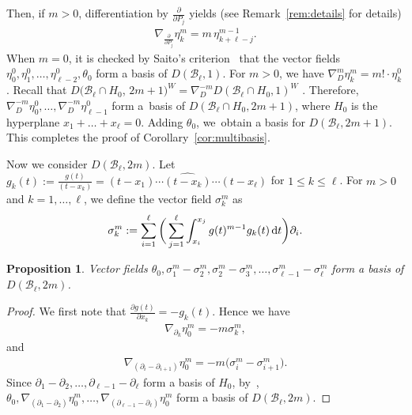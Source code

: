 \documentclass[pdftex]{sigma}
\numberwithin{equation}{section}
\newtheorem{Proposition}[Theorem]{Proposition}
{ \theoremstyle{definition}
\newtheorem{Definition}[Theorem]{Definition}
\newtheorem{Example}[Theorem]{Example}
\newtheorem{Remark}[Theorem]{Remark} }
\newcommand{\B}{\mathcal{B}}
\begin{document}
Then, if $m>0$, differentiation by $\frac{\partial}{\partial P_j}$ yields
(see Remark~\ref{rem:details} for details)
\begin{gather}
\label{eq:bibun}
\nabla_{\frac{\partial}{\partial P_j}}\eta_k^m=m\,\eta_{k+\ell-j}^{m-1}.
\end{gather}
When $m=0$, it is checked by Saito's criterion~\cite{ot,sai-log} that
the vector fields
$\eta_0^0, \eta_1^0, \dots, \eta_{\ell-2}^0, \theta_0$ form a
basis of $D(\B_\ell, 1)$.
For $m>0$, we have $\nabla_D^m\eta_k^m=m!\cdot\eta_k^0$.
Recall that
$D(\B_\ell\cap H_0$, $2m+1)^W=\nabla_D^{-m}D(\B_\ell\cap H_0, 1)^W$
\cite[Corollary~10]{yos-prim}. Therefore,
$\nabla_D^{-m}\eta_0^0, \dots, \nabla_D^{-m}\eta_{\ell-1}^0$ form a~basis of $D(\B_\ell\cap H_0, 2m+1)$, where $H_0$ is the hyperplane
$x_1+\dots + x_\ell=0$. Adding $\theta_0$, we~obtain a basis for
$D(\B_\ell, 2m+1)$.
This completes the proof of Corollary~\ref{cor:multibasis}.

Now we consider $D(\B_\ell, 2m)$. Let
$g_k(t):=\frac{g(t)}{(t-x_k)}=(t-x_1)\cdots \widehat{(t-x_k)}\cdots (t-x_\ell)$
for $1\leq k\leq \ell$.
For $m>0$ and $k=1, \dots, \ell$, we define the vector field $\sigma_k^m$ as
\begin{gather}
\label{eq:sigma1}
\sigma_k^m:=\sum_{i=1}^\ell\bigg(\sum_{j=1}^\ell\int_{x_i}^{x_j}g(t)^{m-1}g_k(t)\, {\rm d}t \bigg)\partial_i.
\end{gather}

\begin{Proposition}
\label{prop:simpleroots}
Vector fields
$\theta_0, \sigma_1^m-\sigma_2^m, \sigma_2^m-\sigma_3^m, \dots, \sigma_{\ell-1}^m-\sigma_\ell^m$ form a basis of $D(\B_\ell, 2m)$.
\end{Proposition}

\begin{proof}
We first note that $\frac{\partial g(t)}{\partial x_k}=-g_k(t)$. Hence we have
\begin{gather}
\label{eq:differentiate2}
\nabla_{\partial_k}\eta_0^m=-m\sigma_k^m,
\end{gather}
and
\begin{gather*}
\nabla_{(\partial_i-\partial_{i+1})}\eta_0^m=-m\big(\sigma_i^m-\sigma_{i+1}^m\big).
\end{gather*}
Since $\partial_1-\partial_2, \dots, \partial_{\ell-1}-\partial_\ell$
form a basis of $H_0$, by~\cite[Theorem 7]{yos-prim},
$\theta_0,\! \nabla_{\!(\partial_1-\partial_2)}\eta_0^m, \dots,\!
\nabla_{\!(\partial_{\ell-1}-\partial_\ell)}\eta_0^m$
form a basis of $D(\B_\ell, 2m)$.
\end{proof}
\end{document}
